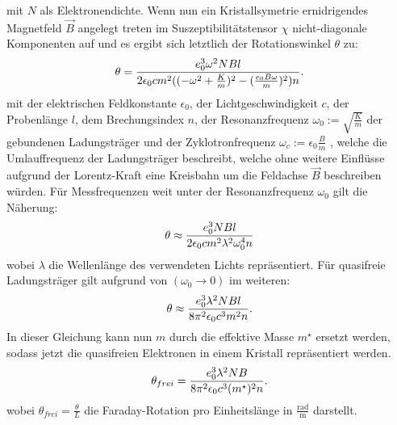 mit $N$ als Elektronendichte. Wenn nun ein Kristallsymetrie ernidrigendes Magnetfeld $\vec{B}$ angelegt treten im Suszeptibilitätstensor
$\chi$ nicht-diagonale Komponenten auf und es ergibt sich letztlich der Rotationswinkel $\theta$ zu:
\begin{equation*}
  \theta = \frac{e_0^3 \omega^2 NBl}{2\epsilon_0 cm^2((-\omega^2+\frac{K}{m})^2-(\frac{e_0B\omega}{m})^2)n}.\\
\end{equation*}
mit der elektrischen Feldkonstante $\epsilon_0$, der Lichtgeschwindigkeit $c$, der Probenlänge $l$, dem
Brechungsindex $n$, der Resonanzfrequenz $\omega_0:= \sqrt{\frac{K}{m}}$ der gebundenen Ladungsträger
und der Zyklotronfrequenz $\omega_c:=\epsilon_0\frac{B}{m}$ , welche die Umlauffrequenz der Ladungsträger
beschreibt, welche ohne weitere Einflüsse aufgrund der Lorentz-Kraft eine Kreisbahn um
die Feldachse $\vec{B}$ beschreiben würden. Für Messfrequenzen weit unter der Resonanzfrequenz
$\omega_0$ gilt die Näherung:
\begin{equation*}
  \theta \approx \frac{e_0^3 NBl}{2\epsilon_0cm^2\lambda^2\omega_0^4n}\\
\end{equation*}
wobei $\lambda$ die Wellenlänge des verwendeten Lichts repräsentiert. Für quasifreie Ladungsträger gilt aufgrund von $(\omega_0\rightarrow 0)$ im weiteren:
\begin{equation*}
  \theta \approx \frac{e_0^3\lambda^2NBl}{8\pi^2\epsilon_0c^3m^2n}.\\
\end{equation*}
In dieser Gleichung kann nun $m$ durch die effektive Masse $m^{\star}$ ersetzt werden, sodass jetzt  die quasifreien Elektronen in einem Kristall repräsentiert werden.
\begin{equation}
  \label{eq:thetafrei}
  \theta_{frei}=\frac{e_0^3\lambda^2NB}{8\pi^2\epsilon_0c^3(m^{\star})^2n}.\\
\end{equation}
wobei $\theta_{frei}=\frac{\theta}{L}$ die Faraday-Rotation pro Einheitslänge in $\frac{\mathrm{rad}}{\mathrm{m}}$ darstellt.